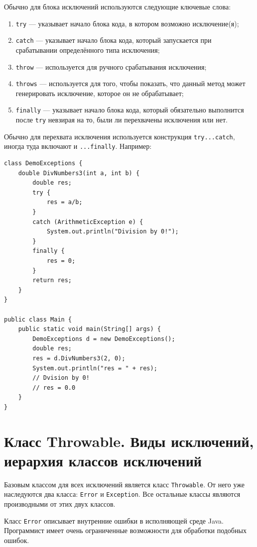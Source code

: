 Обычно для блока исключений используются следующие ключевые слова:

\begin{enumerate}
    \item \verb|try| — указывает начало блока кода, в котором возможно исключение(я);
    \item \verb|catch| — указывает начало блока кода, который запускается при срабатывании определённого типа исключения;
    \item \verb|throw| — используется для ручного срабатывания исключения;
    \item \verb|throws| — используется для того, чтобы показать, что данный метод может генерировать исключение, которое он не обрабатывает;
    \item \verb|finally| — указывает начало блока кода, который обязательно выполнится после \verb|try| невзирая на то, были ли перехвачены исключения или нет.
\end{enumerate}

Обычно для перехвата исключения используется конструкция \verb|try...catch|, иногда туда включают и \verb|...finally|. Например:

\begin{lstlisting}
class DemoExceptions {
    double DivNumbers3(int a, int b) {
        double res;
        try {
            res = a/b;
        }
        catch (ArithmeticException e) {
            System.out.println("Division by 0!");
        }
        finally {
            res = 0;
        }
        return res;
    }
}

public class Main {
    public static void main(String[] args) {
        DemoExceptions d = new DemoExceptions();
        double res;
        res = d.DivNumbers3(2, 0);
        System.out.println("res = " + res);
        // Dvision by 0!
        // res = 0.0
    }
}
\end{lstlisting}

\section{Класс Throwable. Виды исключений, иерархия классов исключений}

Базовым классом для всех исключений является класс \verb|Throwable|. От него уже наследуются два класса: \verb|Error| и \verb|Exception|. Все остальные классы являются производными от этих двух классов.

Класс \verb|Error| описывает внутренние ошибки в исполняющей среде Java. Программист имеет очень ограниченные возможности для обработки подобных ошибок.

